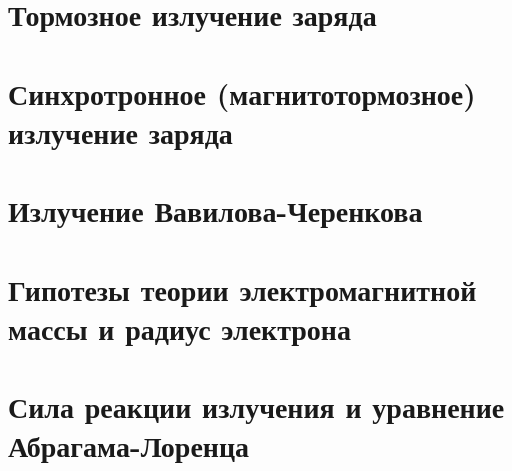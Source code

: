 \documentclass[10pt,landscape,a4paper]{article}
\begin{document}
\begin{multicols*}{5}
		\section{Тормозное излучение заряда}
		\section{Синхротронное (магнитотормозное) излучение заряда}
		\section{Излучение Вавилова-Черенкова}
		\section{Гипотезы теории электромагнитной массы и радиус электрона}
		\section{Сила реакции излучения и уравнение Абрагама-Лоренца}
	\end{multicols*}
\end{document}

